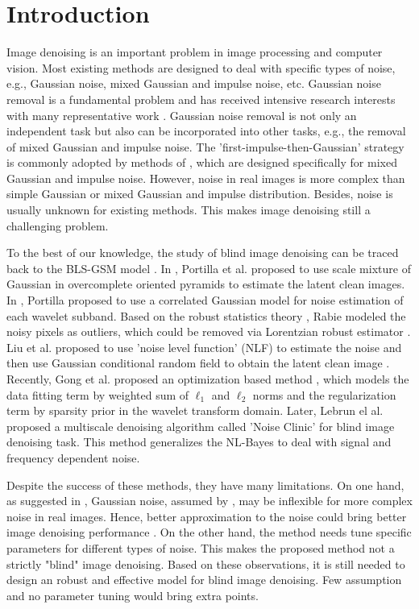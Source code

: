 \documentclass[runningheads]{llncs}
\begin{document}
\section{Introduction}
Image denoising is an important problem in image processing and computer vision. Most existing methods are designed to deal with specific types of noise, e.g., Gaussian noise, mixed Gaussian and impulse noise, etc. Gaussian noise removal is a fundamental problem and has received intensive research interests with many representative work \cite{rudin1992nonlinear,nlm,foe,ksvd,bm3d,lssc,epll,mlp}. Gaussian noise removal is not only an independent task but also can be incorporated into other tasks, e.g., the removal of mixed Gaussian and impulse noise. The 'first-impulse-then-Gaussian' strategy is commonly adopted by methods of \cite{cai2010fast,l1l0,wesnr}, which are designed specifically for mixed Gaussian and impulse noise. However, noise in real images is more complex than simple Gaussian or mixed Gaussian and impulse distribution. Besides, noise is usually unknown for existing methods. This makes image denoising still a challenging problem.

To the best of our knowledge, the study of blind image denoising can be traced back to the BLS-GSM model \cite{blsgsm}. In \cite{blsgsm}, Portilla et al. proposed to use scale mixture of Gaussian in overcomplete oriented pyramids to estimate the latent clean images. In \cite{fullyblind}, Portilla proposed to use a correlated Gaussian model for noise estimation of each wavelet subband. Based on the robust statistics theory \cite{huber2011robust}, Rabie modeled the noisy pixels as outliers, which could be removed via Lorentzian robust estimator \cite{rabie2005robust}. Liu et al. proposed to use 'noise level function' (NLF) to estimate the noise and then use Gaussian conditional random field to obtain the latent clean image \cite{Liu2008}. Recently, Gong et al. proposed an optimization based method \cite{almapg}, which models the data fitting term by weighted sum of $\ell_{1}$ and $\ell_{2}$ norms and the regularization term by sparsity prior in the wavelet transform domain. Later, Lebrun el al. proposed a multiscale denoising algorithm called 'Noise Clinic' \cite{noiseclinic} for blind image denoising task. This method generalizes the NL-Bayes \cite{nlbayes} to deal with signal and frequency dependent noise.

Despite the success of these methods, they have many limitations. On one hand, as suggested in \cite{Liu2008,noiseclinic}, Gaussian noise, assumed by \cite{fullyblind,rabie2005robust,Liu2008}, may be inflexible for more complex noise in real images. Hence, better approximation to the noise could bring better image denoising performance \cite{Liu2008,noiseclinic}. On the other hand, the method \cite{almapg} needs tune specific parameters for different types of noise. This makes the proposed method not a strictly "blind" image denoising. Based on these observations, it is still needed to design an robust and effective model for blind image denoising. Few assumption and no parameter tuning would bring extra points.
\end{document}
